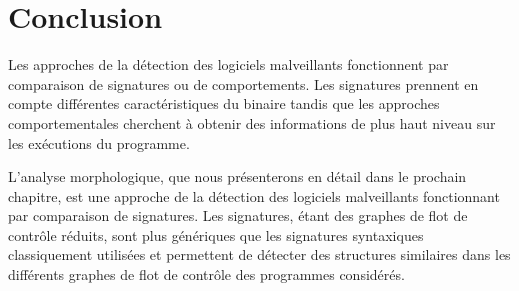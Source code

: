 \section*{Conclusion}
Les approches de la détection des logiciels malveillants fonctionnent par comparaison de signatures ou de comportements.
Les signatures prennent en compte différentes caractéristiques du binaire tandis que les approches comportementales cherchent à obtenir des informations de plus haut niveau sur les exécutions du programme.

L'analyse morphologique, que nous présenterons en détail dans le prochain chapitre, est une approche de la détection des logiciels malveillants fonctionnant par comparaison de signatures.
Les signatures, étant des graphes de flot de contrôle réduits, sont plus génériques que les signatures syntaxiques classiquement utilisées et permettent de détecter des structures similaires dans les différents graphes de flot de contrôle des programmes considérés.